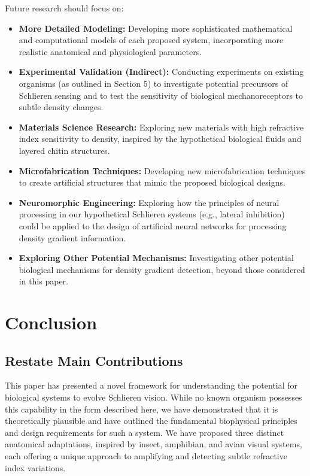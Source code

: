 \documentclass[11pt]{article}
\begin{document}
Future research should focus on:
\begin{itemize}
    \item \textbf{More Detailed Modeling:} Developing more sophisticated mathematical and computational models of each proposed system, incorporating more realistic anatomical and physiological parameters.
    \item \textbf{Experimental Validation (Indirect):} Conducting experiments on existing organisms (as outlined in Section 5) to investigate potential precursors of Schlieren sensing and to test the sensitivity of biological mechanoreceptors to subtle density changes.
    \item \textbf{Materials Science Research:} Exploring new materials with high refractive index sensitivity to density, inspired by the hypothetical biological fluids and layered chitin structures.
    \item \textbf{Microfabrication Techniques:} Developing new microfabrication techniques to create artificial structures that mimic the proposed biological designs.
    \item \textbf{Neuromorphic Engineering:} Exploring how the principles of neural processing in our hypothetical Schlieren systems (e.g., lateral inhibition) could be applied to the design of artificial neural networks for processing density gradient information.
    \item \textbf{Exploring Other Potential Mechanisms:} Investigating other potential biological mechanisms for density gradient detection, beyond those considered in this paper.
\end{itemize}

\section{Conclusion}

\subsection{Restate Main Contributions}

This paper has presented a novel framework for understanding the potential for biological systems to evolve Schlieren vision. While no known organism possesses this capability in the form described here, we have demonstrated that it is theoretically plausible and have outlined the fundamental biophysical principles and design requirements for such a system. We have proposed three distinct anatomical adaptations, inspired by insect, amphibian, and avian visual systems, each offering a unique approach to amplifying and detecting subtle refractive index variations.
\end{document}

